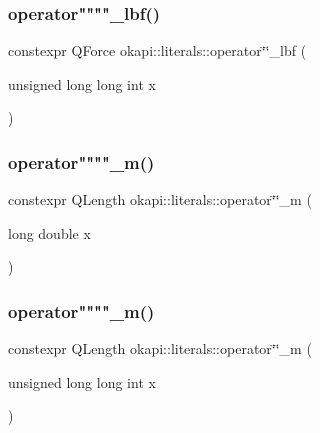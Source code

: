\mbox{\label{namespaceokapi_1_1literals_ac4bd53d2c0d38c6af81494a2142f4263}} 
\subsubsection{\texorpdfstring{operator""""\_lbf()}{operator""\_lbf()}\hspace{0.1cm}{\footnotesize\ttfamily [2/2]}}
{\footnotesize\ttfamily constexpr Q\+Force okapi\+::literals\+::operator\char`\"{}\char`\"{}\+\_\+lbf (\begin{DoxyParamCaption}\item[{unsigned long long int}]{x }\end{DoxyParamCaption})}

\mbox{\label{namespaceokapi_1_1literals_ad860ceea3e6afea62c3cbf34cc423c6d}} 
\subsubsection{\texorpdfstring{operator""""\_m()}{operator""\_m()}\hspace{0.1cm}{\footnotesize\ttfamily [1/2]}}
{\footnotesize\ttfamily constexpr Q\+Length okapi\+::literals\+::operator\char`\"{}\char`\"{}\+\_\+m (\begin{DoxyParamCaption}\item[{long double}]{x }\end{DoxyParamCaption})}

\mbox{\label{namespaceokapi_1_1literals_ad7a8fb6325c0bdf2fb444cb95bb8f0a7}} 
\subsubsection{\texorpdfstring{operator""""\_m()}{operator""\_m()}\hspace{0.1cm}{\footnotesize\ttfamily [2/2]}}
{\footnotesize\ttfamily constexpr Q\+Length okapi\+::literals\+::operator\char`\"{}\char`\"{}\+\_\+m (\begin{DoxyParamCaption}\item[{unsigned long long int}]{x }\end{DoxyParamCaption})}

